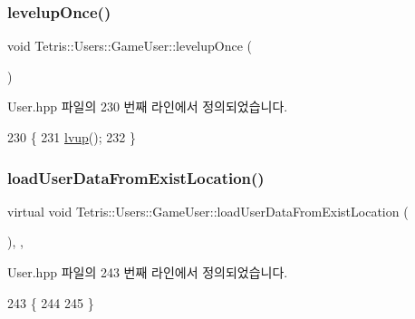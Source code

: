 \subsubsection{\texorpdfstring{levelup\+Once()}{levelupOnce()}}
{\footnotesize\ttfamily void Tetris\+::\+Users\+::\+Game\+User\+::levelup\+Once (\begin{DoxyParamCaption}{ }\end{DoxyParamCaption})\hspace{0.3cm}{\ttfamily [inline]}}



User.\+hpp 파일의 230 번째 라인에서 정의되었습니다.


\begin{DoxyCode}
230                               \{
231                 \hyperlink{class_tetris_1_1_users_1_1_game_user_ad7bdfbb3fc18ca0a1cdfcb34faaed6ff}{lvup}();
232             \}
\end{DoxyCode}
\mbox{\label{class_tetris_1_1_users_1_1_game_user_a730bd78525a4802685b53c67b38eca0c}} 
\subsubsection{\texorpdfstring{load\+User\+Data\+From\+Exist\+Location()}{loadUserDataFromExistLocation()}}
{\footnotesize\ttfamily virtual void Tetris\+::\+Users\+::\+Game\+User\+::load\+User\+Data\+From\+Exist\+Location (\begin{DoxyParamCaption}{ }\end{DoxyParamCaption})\hspace{0.3cm}{\ttfamily [inline]}, {\ttfamily [protected]}, {\ttfamily [virtual]}}



User.\+hpp 파일의 243 번째 라인에서 정의되었습니다.


\begin{DoxyCode}
243                                                         \{
244                 
245             \}
\end{DoxyCode}
\mbox{\label{class_tetris_1_1_users_1_1_game_user_ad7bdfbb3fc18ca0a1cdfcb34faaed6ff}} 
